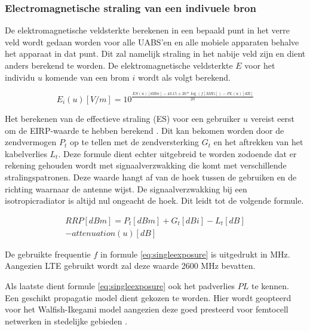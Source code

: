 \documentclass[twocolumn]{phdsymp} %
\begin{document}
\subsubsection{Electromagnetische straling van een indivuele bron}
\label{sec:calculatingexposure}

De elektromagnetische veldsterkte berekenen in een bepaald punt in het verre veld wordt gedaan worden voor alle \gls{UABS}'en en 
alle mobiele apparaten behalve het apparaat in dat punt. Dit zal namelijk straling in het nabije veld zijn en dient anders berekend te worden. 
De elektromagnetische veldsterkte $E$ voor het individu $u$ komende van een brom $i$ wordt als volgt berekend.

\begin{equation}
E_i(u) [V/m] = 10^{\frac{ES(u)[dBm] - 43.15 + 20*\log(f [MHz])- PL(u) [dB]}{20}}
\label{eq:singleexposure}
\end{equation}

Het berekenen van de effectieve straling (ES) voor een gebruiker $u$ vereist eerst om de  \gls{EIRP}-waarde te hebben berekend 
 \cite{J6_originalExposureFormula,J1}. Dit kan bekomen worden door de zendvermogen $P_t$ op te tellen met de zendversterking $G_t$
 en het aftrekken van het kabelverlies $L_t$.
 Deze formule dient echter uitgebreid te worden zodoende dat er rekening gehouden wordt met signaalverzwakking die komt met
 verschillende stralingspatronen. Deze waarde hangt af van de hoek tussen de gebruiken en de richting waarnaar de antenne wijst. 
 De signaalverzwakking bij een \gls{isotropicradiator} is altijd nul ongeacht de hoek.
 Dit leidt tot de volgende formule.

\begin{equation}
\begin{aligned}
RRP [dBm] = P_t [dBm] + G_t [dBi]- L_t [dB]\\
     - attenuation(u) [dB]
\end{aligned}
\label{eq:eirp}
\end{equation}

De gebruikte frequentie $f$ in formule \ref{eq:singleexposure} is uitgedrukt in MHz. Aangezien 
\gls{LTE} gebruikt wordt zal deze waarde 2600 MHz bevatten.

Als laatste dient formule \ref{eq:singleexposure} ook het padverlies $PL$ te kennen.
Een geschikt propagatie model dient gekozen te worden. Hier wordt geopteerd voor het 
Walfish-Ikegami model aangezien deze goed presteerd voor femtocell netwerken in stedelijke gebieden \cite{J2}.
\end{document}
